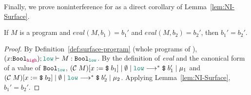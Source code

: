 Finally, we prove noninterference for \Surface as a direct corollary of
Lemma~\ref{lem:NI-Surface}.

\begin{theorem}
  \label{thm:NI-Surface}
  If $M$ is a \Surface program and $\mathit{eval}(M,b_1)=b_1'$ and $\mathit{eval}(M,b_2)=b_2'$,
  then $b_1' = b_2'$.
\end{theorem}
\begin{proof}
  By Definition~\ref{def:surface-program} (whole programs of \Surface),
  $(x{:}\Bool_{\high}) ; \low \vdash M : \Bool_{\low}$. By the definition of
  \textit{eval} and the canonical form of a value of $\Bool_{\low}$,
  $\reducemult{(\compile{M}) [ x := \ccconst{b_1}]}{\emptyset}{\low}{\ccconst{b_1'}}{\mu_1}$ and
  $\reducemult{(\compile{M}) [ x := \ccconst{b_2}]}{\emptyset}{\low}{\ccconst{b_2'}}{\mu_2}$.
  Applying Lemma~\ref{lem:NI-Surface}, $b_1'=b_2'$.
\end{proof}
